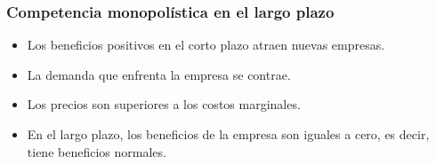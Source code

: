 \documentclass{beamer}
\begin{document}
\begin{frame}
\frametitle{Competencia monopolística en el largo plazo}
\begin{itemize}
    \item Los beneficios positivos en el corto plazo atraen nuevas empresas.\vspace{2mm}
    \item La demanda que enfrenta la empresa se contrae.\vspace{2mm}
    \item Los precios son superiores a los costos marginales.\vspace{2mm}
    \item En el largo plazo, los beneficios de la empresa son iguales a cero, es decir, tiene beneficios normales.
\end{itemize}
\end{frame}
\end{document}

